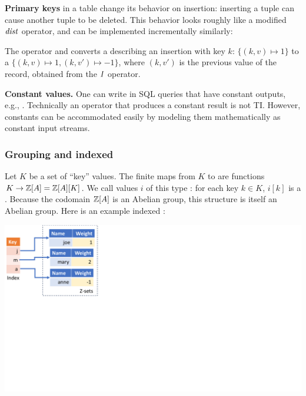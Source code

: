 \textbf{Primary keys} in a table change its behavior on insertion:
inserting a tuple can cause another tuple to be deleted.  This
behavior looks roughly like a modified $\mathit{dist}$ operator, and can
be implemented incrementally similarly:

\begin{center}
\end{center}

\noindent The  operator and converts a \zr describing an
insertion with key $k$: $\{ (k, v) \mapsto 1 \}$ to a \zr $\{ (k, v)
\mapsto 1, (k, v') \mapsto -1 \}$, where $(k, v')$ is the previous
value of the record, obtained from the $\mathit{I}$ operator.

\textbf{Constant values.}  One can write in SQL queries that have
constant outputs, e.g., .  Technically an operator that
produces a constant result is not TI.  However, constants can be
accommodated easily by modeling them mathematically as constant input
streams.

\subsubsection{Grouping and indexed \zrs}\label{sec:grouping}

Let $K$ be a set of ``key'' values.  The finite maps from $K$ to \zrs
are functions $K \to \mathbb{Z}[A] = \mathbb{Z}[A][K]$.  We call values $i$ of this
type : for each key $k \in K$, $i[k]$ is a \zr.
Because the codomain $\mathbb{Z}[A]$ is an Abelian group, this structure is
itself an Abelian group.  Here is an example indexed \zr:

\begin{center}
  \includegraphics[trim={0 4.2in 7.5in 0},clip,scale=.34]{indexed.pdf}
\end{center}

